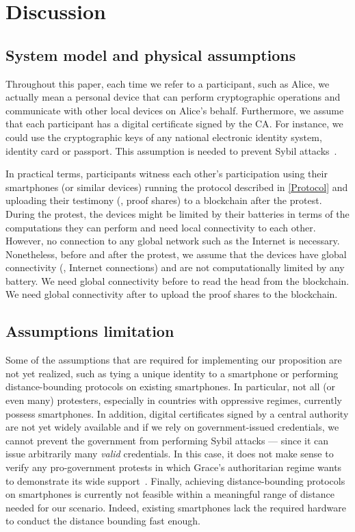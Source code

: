 \section{Discussion}%
\label{Discussion}

\subsection{System model and physical assumptions}
\label{assumptions}

Throughout this paper, each time we refer to a participant, such as Alice, we actually mean a personal device that can perform cryptographic operations and communicate with other local devices on Alice's behalf. 
Furthermore, we assume that each participant has a digital certificate signed by the \ac{CA}.
For instance, we could use the cryptographic keys of any national electronic identity system, identity card or passport.
This assumption is needed to prevent Sybil attacks~\cite{SybilAttack}.

In practical terms, participants witness each other's participation using their smartphones (or similar devices) running the protocol described in \cref{Protocol} and uploading their testimony (\ie, proof shares) to a blockchain after the protest. 
During the protest, the devices might be limited by their batteries in terms of the computations they can perform and need local connectivity to each other.
However, no connection to any global network such as the Internet is necessary. 
Nonetheless, before and after the protest, we assume that the devices have global connectivity (\ie, Internet connections) and are not computationally limited by any battery.
We need global connectivity before to read the head from the blockchain.
We need global connectivity after to upload the proof shares to the blockchain.



\subsection{Assumptions limitation} 

Some of the assumptions that are required for implementing our proposition are not yet realized, such as tying a unique identity to a smartphone or performing distance-bounding protocols on existing smartphones. 
In particular, not all (or even many) protesters, especially in countries with oppressive regimes, currently possess smartphones.
In addition, digital certificates signed by a central authority are not yet widely available and if we rely on government-issued credentials, we cannot prevent the government from performing Sybil attacks --- since it can issue arbitrarily many \emph{valid} credentials.
In this case, it does not make sense to verify any pro-government protests in which Grace's authoritarian regime wants to demonstrate its wide support~\cite{AlJazeeraOnVenezuela2017,VenezuelanStateWorkersCalledToParticipate}.
Finally, achieving distance-bounding protocols on smartphones is currently not feasible within a meaningful range of distance needed for our scenario.
Indeed, existing smartphones lack the required hardware to conduct the distance bounding fast enough.


